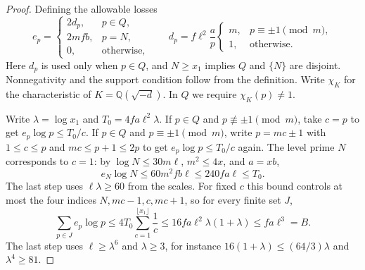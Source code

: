\begin{proof}
Defining the allowable losses
\[
 e_p=
 \begin{cases}
 2d_p, &p\in Q,\\
 2mfb,&p=N,\\
 0,&\text{otherwise},
 \end{cases}
 \qquad
 d_p=f\ell^2\frac ap
       \begin{cases}m,&p\equiv\pm1\pmod m,\\ 1,&\text{otherwise}.
       \end{cases}
\]
Here $d_p$ is used only when $p\in Q$, and $N\ge x_1$ implies $Q$ and $\{N\}$ are disjoint. Nonnegativity and the support condition follow from the definition. Write $\chi_K$ for the characteristic of $K=\mathbb Q(\sqrt{-d})$. In $Q$ we require $\chi_K(p)\ne1$.

Write $\lambda=\log x_1$ and $T_0=4fa\ell^2\lambda$. If $p\in Q$ and $p\not\equiv\pm1\pmod m$, take $c=p$ to get $e_p\log p\le T_0/c$. If $p\in Q$ and $p\equiv\pm1\pmod m$, write $p=mc\pm1$ with $1\le c\le p$ and $mc\le p+1\le2p$ to get $e_p\log p\le T_0/c$ again. The level prime $N$ corresponds to $c=1$: by $\log N\le30m\ell$, $m^2\le4x$, and $a=xb$,
\[
 e_N\log N\le60m^2fb\ell\le240fa\ell\le T_0 .
\]
The last step uses $\ell\lambda\ge60$ from the scales. For fixed $c$ this bound controls at most the four indices $N,mc-1,c,mc+1$, so for every finite set $J$,
\[
 \sum_{p\in J} e_p\log p\le
 4T_0\sum_{c=1}^{\lfloor x_1\rfloor}\frac1c
 \le16fa\ell^2\lambda(1+\lambda)\le fa\ell^3=B.
\]
The last step uses $\ell\ge\lambda^6$ and $\lambda\ge3$, for instance $16(1+\lambda)\le(64/3)\lambda$ and $\lambda^4\ge81$.


\end{proof}
